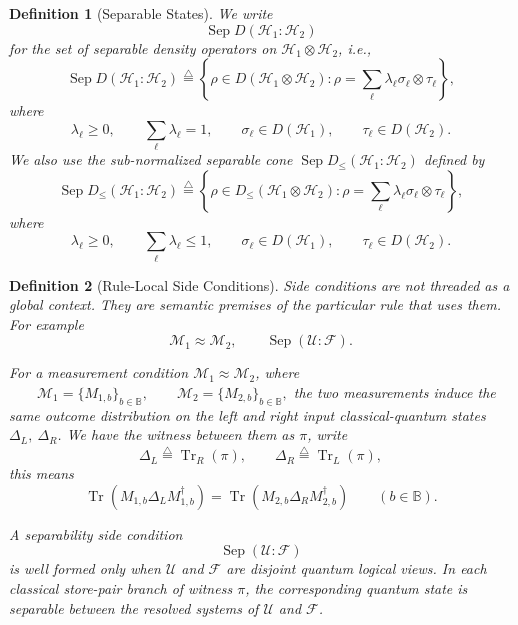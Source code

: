 \documentclass[acmsmall,screen,review,anonymous,nonacm]{acmart}
\newtheorem{definition}{Definition}[section]
\theoremstyle{defn_style}
\begin{document}
\begin{definition}[Separable States]
We write
\[
\operatorname{Sep}D(\mathcal H_1:\mathcal H_2)
\]
for the set of separable density operators on
\(\mathcal H_1\otimes\mathcal H_2\), i.e.,
\[
\operatorname{Sep}D(\mathcal H_1:\mathcal H_2)
\stackrel{\triangle}{=}
\left\{
\rho\in D(\mathcal H_1\otimes\mathcal H_2)
:
\rho=\sum_{\ell}\lambda_{\ell}\sigma_{\ell}\otimes\tau_{\ell}
\right\},
\]
where
\[
\lambda_{\ell}\geq 0,\qquad
\sum_{\ell}\lambda_{\ell}=1,\qquad
\sigma_{\ell}\in D(\mathcal H_1),\qquad
\tau_{\ell}\in D(\mathcal H_2).
\]
We also use the sub-normalized separable cone
\(\operatorname{Sep}D_{\leq}(\mathcal H_1:\mathcal H_2)\)
defined by
\[
\operatorname{Sep}D_{\leq}(\mathcal H_1:\mathcal H_2)
\stackrel{\triangle}{=}
\left\{
\rho\in D_{\leq}(\mathcal H_1\otimes\mathcal H_2)
:
\rho=\sum_{\ell}\lambda_{\ell}\sigma_{\ell}\otimes\tau_{\ell}
\right\},
\]
where
\[
\lambda_{\ell}\geq 0,\qquad
\sum_{\ell}\lambda_{\ell}\leq 1,\qquad
\sigma_{\ell}\in D(\mathcal H_1),\qquad
\tau_{\ell}\in D(\mathcal H_2).
\]
\end{definition}


\begin{definition}[Rule-Local Side Conditions]
Side conditions are not threaded as a global context. They are semantic
premises of the particular rule that uses them. For example
\[
\mathcal M_1\approx \mathcal M_2,
\qquad
\operatorname{Sep}(\mathcal U:\mathcal F).
\]


For a measurement condition
\(\mathcal M_1\approx \mathcal M_2\), where
\(\qquad\mathcal M_1=\{M_{1,b}\}_{b\in\mathbb B},
\qquad
\mathcal M_2=\{M_{2,b}\}_{b\in\mathbb B},\) the two measurements induce the same outcome distribution on the
left and right input classical-quantum states \(\Delta_L,~\Delta_R\). We have the witness between them as \(\pi\), write
\[
\Delta_L\stackrel{\triangle}{=}\operatorname{Tr}_R(\pi),
\qquad
\Delta_R\stackrel{\triangle}{=}\operatorname{Tr}_L(\pi),
\]
this means
\[
\operatorname{Tr}
\left(
M_{1,b}\Delta_L M_{1,b}^{\dagger}
\right)
=
\operatorname{Tr}
\left(
M_{2,b}\Delta_R M_{2,b}^{\dagger}
\right)
\qquad
(b\in\mathbb B).
\]

A separability side condition
\[
\operatorname{Sep}(\mathcal U:\mathcal F)
\]
is well formed only when \(\mathcal U\) and \(\mathcal F\) are disjoint
quantum logical views. In each classical store-pair branch of witness \(\pi\), the corresponding
quantum state is separable between the resolved systems of
\(\mathcal U\) and \(\mathcal F\).
\end{definition}
\end{document}
